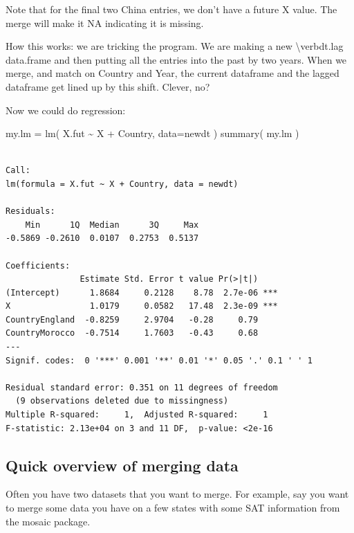 \documentclass[
  letterpaper,
  DIV=11,
  numbers=noendperiod]{scrreprt}
\newenvironment{Shaded}{\begin{snugshade}}{\end{snugshade}}
\newcommand{\AttributeTok}[1]{\textcolor[rgb]{0.49,0.56,0.16}{#1}}
\newcommand{\FunctionTok}[1]{\textcolor[rgb]{0.02,0.16,0.49}{#1}}
\newcommand{\NormalTok}[1]{\textcolor[rgb]{0.00,0.44,0.13}{#1}}
\newcommand{\OtherTok}[1]{\textcolor[rgb]{0.00,0.44,0.13}{#1}}
\newcommand{\SpecialCharTok}[1]{\textcolor[rgb]{0.25,0.44,0.63}{#1}}
\begin{document}
Note that for the final two China entries, we don't have a future X
value. The merge will make it NA indicating it is missing.

How this works: we are tricking the program. We are making a new
\textbackslash verb\textbar dt.lag\textbar{} data.frame and then putting
all the entries into the past by two years. When we merge, and match on
Country and Year, the current dataframe and the lagged dataframe get
lined up by this shift. Clever, no?

Now we could do regression:

\begin{Shaded}
\begin{Highlighting}[]
\NormalTok{my.lm }\OtherTok{=} \FunctionTok{lm}\NormalTok{( X.fut }\SpecialCharTok{\textasciitilde{}}\NormalTok{ X }\SpecialCharTok{+}\NormalTok{ Country, }\AttributeTok{data=}\NormalTok{newdt )}
\FunctionTok{summary}\NormalTok{( my.lm )}
\end{Highlighting}
\end{Shaded}

\begin{verbatim}

Call:
lm(formula = X.fut ~ X + Country, data = newdt)

Residuals:
    Min      1Q  Median      3Q     Max 
-0.5869 -0.2610  0.0107  0.2753  0.5137 

Coefficients:
               Estimate Std. Error t value Pr(>|t|)    
(Intercept)      1.8684     0.2128    8.78  2.7e-06 ***
X                1.0179     0.0582   17.48  2.3e-09 ***
CountryEngland  -0.8259     2.9704   -0.28     0.79    
CountryMorocco  -0.7514     1.7603   -0.43     0.68    
---
Signif. codes:  0 '***' 0.001 '**' 0.01 '*' 0.05 '.' 0.1 ' ' 1

Residual standard error: 0.351 on 11 degrees of freedom
  (9 observations deleted due to missingness)
Multiple R-squared:     1,  Adjusted R-squared:     1 
F-statistic: 2.13e+04 on 3 and 11 DF,  p-value: <2e-16
\end{verbatim}

\hypertarget{quick-overview-of-merging-data}{%
\subsection{Quick overview of merging
data}\label{quick-overview-of-merging-data}}

Often you have two datasets that you want to merge. For example, say you
want to merge some data you have on a few states with some SAT
information from the mosaic package.
\end{document}
